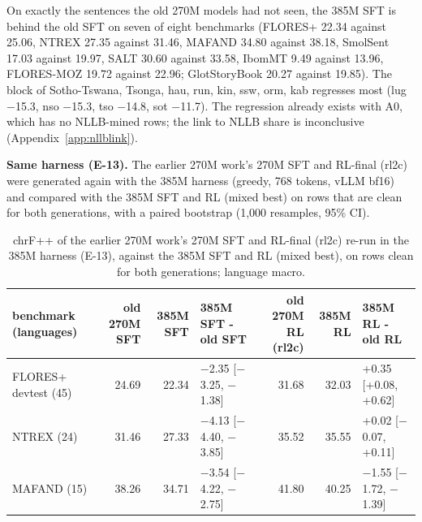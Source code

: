 On exactly the sentences the old 270M models had not seen, the 385M SFT is behind the old SFT on seven of eight benchmarks (FLORES+ 22.34 against 25.06, NTREX 27.35 against 31.46, MAFAND 34.80 against 38.18, SmolSent 17.03 against 19.97, SALT 30.60 against 33.58, IbomMT 9.49 against 13.96, FLORES-MOZ 19.72 against 22.96; GlotStoryBook 20.27 against 19.85). The block of Sotho-Tswana, Tsonga, hau, run, kin, ssw, orm, kab regresses most (lug \ensuremath{-}15.3, nso \ensuremath{-}15.3, tso \ensuremath{-}14.8, sot \ensuremath{-}11.7). The regression already exists with A0, which has no NLLB-mined rows; the link to NLLB share is inconclusive (Appendix~\ref{app:nllblink}). 

\textbf{Same harness (E-13).} The earlier 270M work's 270M SFT and RL-final (rl2c) were generated again with the 385M harness (greedy, 768 tokens, vLLM bf16) and compared with the 385M SFT and RL (mixed best) on rows that are clean for both generations, with a paired bootstrap (1,000 resamples, 95\% CI). 

\begin{table}[t]
\centering\footnotesize
\setlength{\tabcolsep}{4pt}
\caption{chrF++ of the earlier 270M work's 270M SFT and RL-final (rl2c) re-run in the 385M harness (E-13), against the 385M SFT and RL (mixed best), on rows clean for both generations; language macro.}\label{tab:t_old270m}
\begin{tabularx}{\linewidth}{@{}>{\raggedright\arraybackslash}Xrrlrrl@{}}
\toprule
benchmark (languages) & old 270M SFT & 385M SFT & 385M SFT - old SFT & old 270M RL (rl2c) & 385M RL & 385M RL - old RL \\
\midrule
FLORES+ devtest (45) & 24.69 & 22.34 & \ensuremath{-}2.35 [\ensuremath{-}3.25, \ensuremath{-}1.38] & 31.68 & 32.03 & +0.35 [+0.08, +0.62] \\
NTREX (24) & 31.46 & 27.33 & \ensuremath{-}4.13 [\ensuremath{-}4.40, \ensuremath{-}3.85] & 35.52 & 35.55 & +0.02 [\ensuremath{-}0.07, +0.11] \\
MAFAND (15) & 38.26 & 34.71 & \ensuremath{-}3.54 [\ensuremath{-}4.22, \ensuremath{-}2.75] & 41.80 & 40.25 & \ensuremath{-}1.55 [\ensuremath{-}1.72, \ensuremath{-}1.39] \\
\bottomrule
\end{tabularx}
\end{table}

